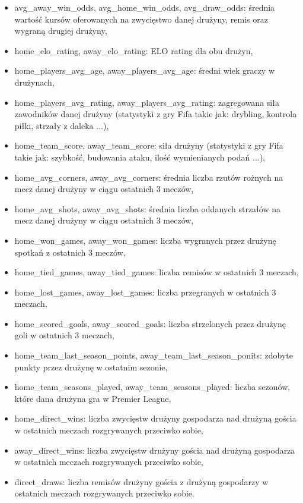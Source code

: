         \begin{itemize}
            \item avg\_away\_win\_odds, avg\_home\_win\_odds, avg\_draw\_odds: średnia wartość kursów oferowanych na zwycięstwo danej drużyny, remis oraz wygraną drugiej drużyny,
            \item home\_elo\_rating, away\_elo\_rating: ELO rating dla obu drużyn,
            \item home\_players\_avg\_age, away\_players\_avg\_age: średni wiek graczy w drużynach, 
            \item home\_players\_avg\_rating, away\_players\_avg\_rating: zagregowana siła zawodników danej drużyny (statystyki z gry Fifa takie jak: drybling, kontrola piłki, strzały z daleka ...), 
            \item home\_team\_score, away\_team\_score: siła drużyny (statystyki z gry Fifa takie jak: szybkość, budowania ataku, ilość wymienianych podań ...), 
            \item home\_avg\_corners, away\_avg\_corners: średnia liczba rzutów rożnych na mecz danej drużyny w ciągu ostatnich 3 meczów, 
            \item home\_avg\_shots, away\_avg\_shots: średnia liczba oddanych strzałów na mecz danej drużyny w ciągu ostatnich 3 meczów, 
            \item home\_won\_games, away\_won\_games: liczba wygranych przez drużynę spotkań z ostatnich 3 meczów, 
            \item home\_tied\_games, away\_tied\_games: liczba remisów w ostatnich 3 meczach, 
            \item home\_lost\_games, away\_lost\_games: liczba przegranych w ostatnich 3 meczach, 
            \item home\_scored\_goals, away\_scored\_goals: liczba strzelonych przez drużynę goli w ostatnich 3 meczach, 
            \item home\_team\_last\_season\_points, away\_team\_last\_season\_ponits: zdobyte punkty przez drużynę w ostatnim sezonie, 
            \item home\_team\_seasons\_played, away\_team\_seasons\_played: liczba sezonów, które dana drużyna gra w Premier League, 
            \item home\_direct\_wins: liczba zwycięstw drużyny gospodarza nad drużyną gościa w ostatnich meczach rozgrywanych przeciwko sobie,
            \item away\_direct\_wins: liczba zwycięstw drużyny gościa nad drużyną gospodarza w ostatnich meczach rozgrywanych przeciwko sobie, 
            \item direct\_draws: liczba remisów drużyny gościa z drużyną gospodarzy w ostatnich meczach rozgrywanych przeciwko sobie. 


        \end{itemize}   
        
